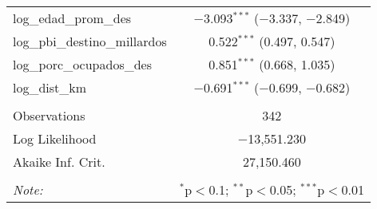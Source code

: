\begin{table}[H]
\begin{tabular}{@{\extracolsep{5pt}}lc}
  log\_edad\_prom\_des & $-$3.093$^{***}$ ($-$3.337, $-$2.849) \\ 
  log\_pbi\_destino\_millardos & 0.522$^{***}$ (0.497, 0.547) \\ 
  log\_porc\_ocupados\_des & 0.851$^{***}$ (0.668, 1.035) \\ 
  log\_dist\_km & $-$0.691$^{***}$ ($-$0.699, $-$0.682) \\ 
 \hline \\[-1.8ex] 
Observations & 342 \\ 
Log Likelihood & $-$13,551.230 \\ 
Akaike Inf. Crit. & 27,150.460 \\ 
\hline 
\hline \\[-1.8ex] 
\textit{Note:}  & \multicolumn{1}{r}{$^{*}$p$<$0.1; $^{**}$p$<$0.05; $^{***}$p$<$0.01} \\ 
\end{tabular} 
\end{table} 
